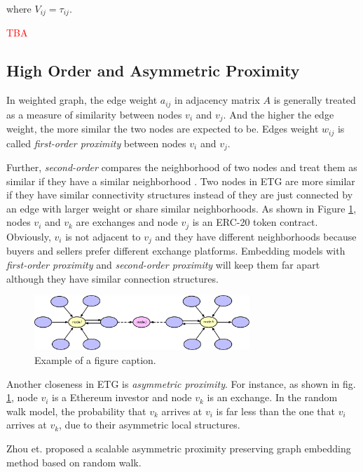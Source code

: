 where $V_{ij}=\tau_{ij}$.

\textcolor{red}{TBA}

\subsection{High Order and Asymmetric Proximity}
In weighted graph, the edge weight $a_{ij}$ in adjacency matrix $A$ is generally treated as a measure of similarity between nodes $v_i$ and $v_j$. And the higher the edge weight, the more similar the two nodes are expected to be. Edges weight $w_{ij}$ is called \emph{first-order proximity} between nodes $v_i$ and $v_j$. 

Further, \emph{second-order} compares the neighborhood of two nodes and treat them as similar if they have a similar neighborhood \cite{goyal2018graph}. Two nodes in ETG are more similar if they have similar connectivity structures instead of they are just connected by an edge with larger weight or share similar neighborhoods. As shown in Figure \ref{fig:high_order}, nodes $v_i$ and $v_k$ are exchanges and node $v_j$ is an ERC-20 token contract. Obviously, $v_i$ is not adjacent to $v_j$ and they have different neighborhoods because buyers and sellers prefer different exchange platforms. Embedding models with \emph{first-order proximity} and \emph{second-order proximity} will keep them far apart although they have similar connection structures. 

\begin{figure}[htbp]
	\centering
	\includegraphics[width=3.2in]{fig/high_order_proximity.eps}
	\caption{Example of a figure caption.}
	\label{fig:high_order}
\end{figure}


Another closeness in ETG is \emph{asymmetric proximity}. For instance, as shown in fig. \ref{fig:high_order}, node $v_i$ is a Ethereum investor and node $v_k$ is an exchange. In the random walk model, the probability that $v_k$ arrives at $v_i$ is far less than the one that $v_i$ arrives at $v_k$, due to their asymmetric local structures.


 Zhou et. proposed a scalable asymmetric proximity preserving graph embedding method based on random walk\cite{zhou2017scalable}. 
